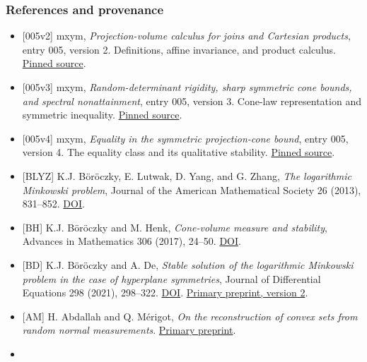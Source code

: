 \documentclass[
  11pt,
]{article}
\providecommand{\tightlist}{%
  \setlength{\itemsep}{0pt}\setlength{\parskip}{0pt}}
\begin{document}
\subsubsection{References and
provenance}\label{references-and-provenance}

\begin{itemize}
\tightlist
\item
  {[}005v2{]} mxym, \emph{Projection-volume calculus for joins and
  Cartesian products}, entry 005, version 2. Definitions, affine
  invariance, and product calculus.
  \href{https://github.com/mxym/math/blob/6785c1c830f8e19e2eb07b0bb89f4d475a8b154a/preprints/005-simplex-product-optimum/v2/paper.md}{Pinned
  source}.
\item
  {[}005v3{]} mxym, \emph{Random-determinant rigidity, sharp symmetric
  cone bounds, and spectral nonattainment}, entry 005, version 3.
  Cone-law representation and symmetric inequality.
  \href{https://github.com/mxym/math/blob/6785c1c830f8e19e2eb07b0bb89f4d475a8b154a/preprints/005-simplex-product-optimum/v3/paper.md}{Pinned
  source}.
\item
  {[}005v4{]} mxym, \emph{Equality in the symmetric projection-cone
  bound}, entry 005, version 4. The equality class and its qualitative
  stability.
  \href{https://github.com/mxym/math/blob/6785c1c830f8e19e2eb07b0bb89f4d475a8b154a/preprints/005-simplex-product-optimum/v4/paper.md}{Pinned
  source}.
\item
  {[}BLYZ{]} K.J. Böröczky, E. Lutwak, D. Yang, and G. Zhang, \emph{The
  logarithmic Minkowski problem}, Journal of the American Mathematical
  Society 26 (2013), 831--852.
  \href{https://doi.org/10.1090/S0894-0347-2012-00741-3}{DOI}.
\item
  {[}BH{]} K.J. Böröczky and M. Henk, \emph{Cone-volume measure and
  stability}, Advances in Mathematics 306 (2017), 24--50.
  \href{https://doi.org/10.1016/j.aim.2016.10.005}{DOI}.
\item
  {[}BD{]} K.J. Böröczky and A. De, \emph{Stable solution of the
  logarithmic Minkowski problem in the case of hyperplane symmetries},
  Journal of Differential Equations 298 (2021), 298--322.
  \href{https://doi.org/10.1016/j.jde.2021.07.002}{DOI}.
  \href{https://arxiv.org/html/2101.03395v2}{Primary preprint, version
  2}.
\item
  {[}AM{]} H. Abdallah and Q. Mérigot, \emph{On the reconstruction of
  convex sets from random normal measurements}.
  \href{https://arxiv.org/abs/1402.5010}{Primary preprint}.
\item

\end{itemize}
\end{document}
